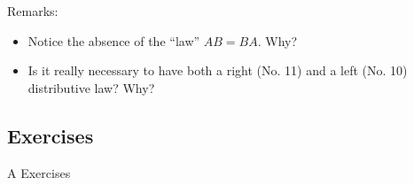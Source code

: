 \documentclass[10pt,]{book}
\theoremstyle{plain}
\theoremstyle{definition}
\theoremstyle{definition}
\theoremstyle{definition}
\theoremstyle{definition}
\begin{document}
\par
Remarks:%
\par
\leavevmode%
\begin{itemize}[label=\textbullet]
\item{} Notice the absence of the ``law'' \(A B = B A\). Why? %
\item{} Is it really necessary to have both a right (No. 11) and a left (No. 10) distributive law? Why?%
\end{itemize}

%
\typeout{************************************************}
\typeout{************************************************}
\subsection[Exercises]{Exercises}\label{exercises-5-5}
\hypertarget{exercisegroup-6}{}\typeout{************************************************}
\typeout{************************************************}
A Exercises%
\end{document}
